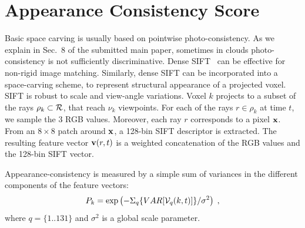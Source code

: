 \documentclass[runningheads]{llncs}
\begin{document}
\section{Appearance Consistency Score}
\label{sec:appearancecore}

Basic space carving is usually based on pointwise photo-consistency. As we explain in Sec.~8 of the submitted main paper, sometimes in clouds photo-consistency is not sufficiently discriminative. Dense SIFT~\cite{DenseSift2011} can be effective for non-rigid image matching. Similarly, dense SIFT can be incorporated into a space-carving scheme, to represent structural appearance of a projected voxel. SIFT is robust to scale and view-angle variations.
Voxel $k$ projects to a subset of the rays $\rho_k\subset{\cal R}$,
that reach $\nu_k$ viewpoints. 
For each of the rays $r\in\rho_k$ at time $t$, we sample the 3 RGB values. Moreover, each ray $r$ corresponds to a pixel ${\bf x}$. From an $8 \times 8$ patch around ${\bf x}$, a 
128-bin SIFT descriptor is extracted.
The resulting feature vector ${\bf v}(r,t)$ is a weighted concatenation of the RGB values and the 128-bin SIFT vector.

Appearance-consistency is measured by a simple sum of variances in the different components of the feature vectors:
\begin{equation}
 P_k= \exp\left(
         -\Sigma_q\{VAR[{\cal V}_q(k,t)]\}/\sigma^2
         \right)
  \;,
 \label{eq:Dist}
\end{equation}
where $q=\{1..131\}$ and $\sigma^2$ is a global scale parameter.






\end{document}
